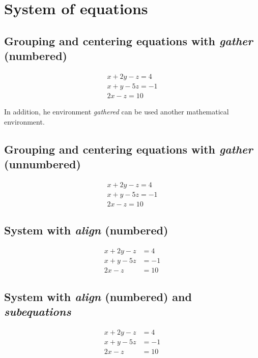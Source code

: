 \documentclass{article}
\begin{document}
\section*{System of equations}

\subsection*{Grouping and centering equations with \emph{gather} (numbered)}



\begin{gather}
	x + 2y - z = 4 \\
	x + y - 5z = -1 \\
	2x - z = 10
\end{gather}

In addition, he environment \emph{gathered} can be used another mathematical environment.

\subsection*{Grouping and centering equations with \emph{gather} (unnumbered)}

\begin{gather*}
x + 2y - z = 4 \\
x + y - 5z = -1 \\
2x - z = 10
\end{gather*}

\subsection*{System with \emph{align} (numbered)}

\begin{align}
	x + 2y - z &= 4 \\
	x + y - 5z &= -1 \\
	2x - z &= 10
\end{align}

\subsection*{System with \emph{align} (numbered) and \emph{subequations}}

\begin{subequations}
	\begin{align}
		x + 2y - z &= 4 \\
		x + y - 5z &= -1 \\
		2x - z &= 10
	\end{align}
\end{subequations}
\end{document}
